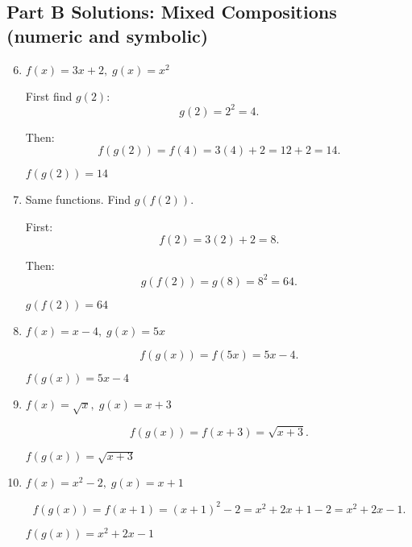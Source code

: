 \documentclass[12pt]{article}
\begin{document}
\subsection*{Part B Solutions: Mixed Compositions (numeric and symbolic)}
\begin{enumerate}
  \setcounter{enumi}{5}
  \item \(f(x) = 3x + 2,\; g(x) = x^2\)

  First find \(g(2)\):
  \[
  g(2) = 2^2 = 4.
  \]

  Then:
  \[
  f(g(2)) = f(4) = 3(4) + 2 = 12 + 2 = 14.
  \]

  \(\boxed{f(g(2)) = 14}\)

  \item Same functions. Find \(g(f(2))\).

  First:
  \[
  f(2) = 3(2) + 2 = 8.
  \]

  Then:
  \[
  g(f(2)) = g(8) = 8^2 = 64.
  \]

  \(\boxed{g(f(2)) = 64}\)

  \item \(f(x) = x - 4,\; g(x) = 5x\)

  \[
  f(g(x)) = f(5x) = 5x - 4.
  \]

  \(\boxed{f(g(x)) = 5x - 4}\)

  \item \(f(x) = \sqrt{x},\; g(x) = x + 3\)

  \[
  f(g(x)) = f(x + 3) = \sqrt{x + 3}.
  \]

  \(\boxed{f(g(x)) = \sqrt{x + 3}}\)

  \item \(f(x) = x^2 - 2,\; g(x) = x + 1\)

  \[
  f(g(x)) = f(x + 1) = (x + 1)^2 - 2 = x^2 + 2x + 1 - 2 = x^2 + 2x - 1.
  \]

  \(\boxed{f(g(x)) = x^2 + 2x - 1}\)
\end{enumerate}
\end{document}
